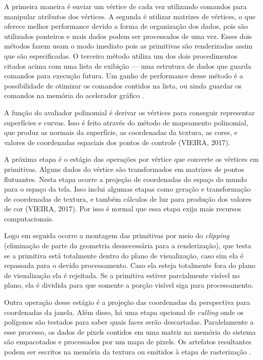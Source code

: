 A primeira maneira é enviar um vértice de cada vez utilizando comandos para manipular atributos dos vértices. A segunda é utilizar matrizes de vértices, o que oferece melhor performance devido a forma de organização dos dados, pois são utilizados ponteiros e mais dados podem ser processados de uma vez. Esses dois métodos fazem usam o modo imediato pois as primitivas são renderizadas assim que são especificadas. O terceiro método utiliza um dos dois procedimentos citados acima com uma lista de exibição --- uma estrutura de dados que guarda comandos para execução futura. Um ganho de performance desse método é a possibilidade de otimizar os comandos contidos na lista, ou ainda guardar os comandos na memória do acelerador gráfico \cite{GLSLBook}. 
	
A função do avaliador polinomial é derivar os vértices para conseguir representar superfícies e curvas. Isso é feito através do método de mapeamento polinomial, que produz as normais da superfície, as coordenadas da textura, as cores, e valores de coordenadas espaciais dos pontos de controle (VIEIRA, 2017)\nocite{pipelnRef}.

A próxima etapa é o estágio das operações por vértice que converte os vértices em primitivas. Alguns dados do vértice são transformados em matrizes de pontos flutuantes. Nesta etapa ocorre a projeção de coordenadas do espaço do mundo para o espaço da tela. Isso inclui algumas etapas como geração e transformação de coordenadas de textura, e também cálculos de luz para produção dos valores de cor (VIEIRA, 2017). Por isso é normal que essa etapa exija mais recursos computacionais. 

Logo em seguida ocorre a montagem das primitivas por meio do \textit{clipping} (eliminação de parte da geometria desnecessária para a renderização), que testa se a primitiva está totalmente dentro do plano de visualização, caso sim ela é repassada para o devido processamento. Caso ela esteja totalmente fora do plano de visualização ela é rejeitada. Se a primitiva estiver parcialmente visível no plano, ela é dividida para que somente a porção visível siga para processamento.

Outra operação desse estágio é a projeção das coordenadas da perspectiva para coordenadas da janela. Além disso, há uma etapa opcional de \textit{culling} onde os polígonos são testados para saber quais faces serão descartadas. Paralelamente a esse processo, os dados de pixels contidos em uma matriz na memória do sistema são empacotados e processados por um mapa de pixels. Os artefatos resultantes podem ser escritos na memória da textura ou emitidos à etapa de rasterização \cite{GLSLBook}.

